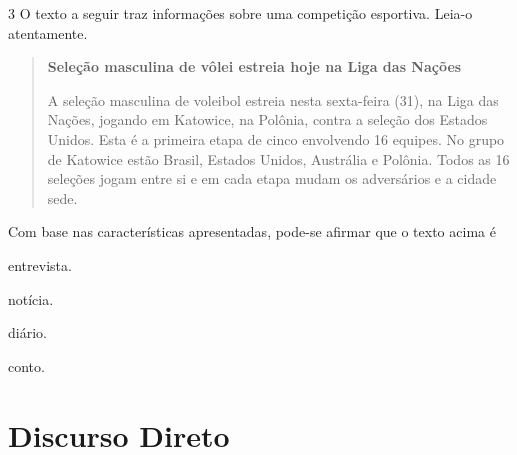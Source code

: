 \num{3} O texto a seguir traz informações sobre uma competição esportiva. 
Leia-o atentamente.

\begin{quote}
\textbf{Seleção masculina de vôlei estreia hoje na Liga das Nações}

A seleção masculina de voleibol estreia nesta sexta-feira
(31), na Liga das Nações, jogando em Katowice, na Polônia, contra a 
seleção dos Estados Unidos.
Esta é a primeira etapa de cinco envolvendo 16 equipes. No grupo de 
Katowice estão Brasil, Estados Unidos, Austrália e Polônia. Todos as 16
seleções jogam entre si e em cada etapa mudam os adversários e a cidade 
sede.

\end{quote}

Com base nas características apresentadas, pode-se afirmar que o texto
acima é 

\begin{escolha}
\item entrevista.

\item notícia.

\item diário.

\item conto.
\end{escolha}



\chapter{Discurso Direto}


